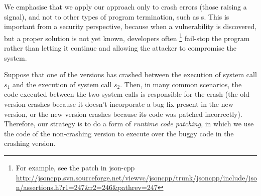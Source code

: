 We emphasise that we apply our approach only to crash errors (those
raising a  signal), and not to other types of program
termination, such as s.  This is important from a
security perspective, because
when a vulnerability is discovered, but a proper solution is not yet
known, developers often
\footnote{For example, see the patch in json-cpp \url{http://jsoncpp.svn.sourceforge.net/viewvc/jsoncpp/trunk/jsoncpp/include/json/assertions.h?r1=247&r2=246&pathrev=247}}
fail-stop the program rather than letting it continue and allowing
the attacker to compromise the system.
%

Suppose that one of the versions has crashed between the execution of
system call $s_1$ and the execution of system call $s_2$.  Then, in
many common scenarios, the code executed between the two system calls
is responsible for the crash (\eg the old version crashes because it
doesn't incorporate a bug fix present in the new version, or the new
version crashes because its code was patched incorrectly).  Therefore,
our strategy is to do a form of \textit{runtime code patching}, in
which we use the code of the non-crashing version to execute over the
buggy code in the crashing version.





